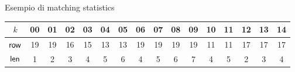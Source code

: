 \documentclass[]{beamer}
\def\len{\mbox{\rm {\sf len}}}
\def\row{\mbox{\rm {\sf row}}}
\begin{document}
\begin{frame}{Esempio di matching statistics}
\begin{table}[H]
    \begin{tabular}{c|ccccccccccccccc}
      $k$ & 00 & 01 & 02 & 03 & 04 &  {\color{nordcyan}05} & 06 & 07 & 08
      &  {\color{nordred}09} & 10 &  {\color{nordgreen}11} & 12 & 13
      &  {\color{nordpurple}14} \\
      \hline
      $\row$ & 19 & 19 & 16 & 15 & 13 &  {\color{nordcyan}13} & 19 & 19 & 19
      &  {\color{nordred}19} & 11 &  {\color{nordgreen}11} & 17 & 17
      &  {\color{nordpurple}17} \\
      $\len$ & 1 & 2 & 3 & 4 & 5 & {\color{nordcyan}6} & 4 & 5 & 6
      & {\color{nordred}7} & 4 & {\color{nordgreen}5} & 2 & 3
      & {\color{nordpurple}4}\\
    \end{tabular}
  \end{table}
\end{frame}
\end{document}
